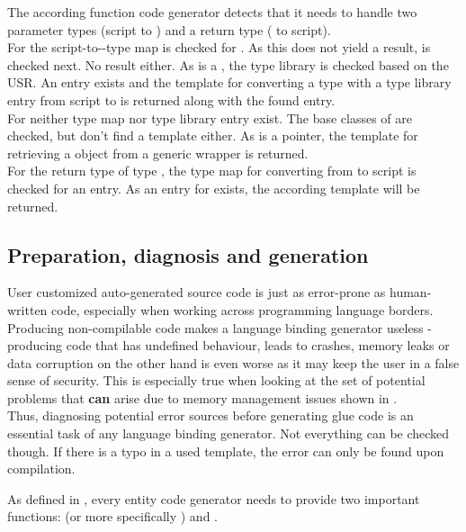 The according function code generator detects that it needs to handle two parameter types (script to ) and a return type ( to script).\\
For  the script-to--type map is checked for . As this does not yield a result,  is checked next. No result either. As  is a , the type library is checked based on the USR. An entry exists and the template for converting a type with a type library entry from script to  is returned along with the found entry.\\
For  neither type map nor type library entry exist. The base classes of  are checked, but don't find a template either. As  is a pointer, the template for retrieving a  object from a generic wrapper is returned.\\
For the return type of type , the type map for converting from  to script is checked for an entry. As an entry for  exists, the according template will be returned.

\subsection{Preparation, diagnosis and generation}

User customized auto-generated source code is just as error-prone as human-written code, especially when working across programming language borders. Producing non-compilable code makes a language binding generator useless - producing code that has undefined behaviour, leads to crashes, memory leaks or data corruption on the other hand is even worse as it may keep the user in a false sense of security. This is especially true when looking at the set of potential problems that \textbf{can} arise due to memory management issues shown in .\\
Thus, diagnosing potential error sources before generating glue code is an essential task of any language binding generator. Not everything can be checked though. If there is a typo in a used template, the error can only be found upon compilation.

As defined in , every entity code generator needs to provide two important functions:  (or more specifically \linebreak{}) and .

